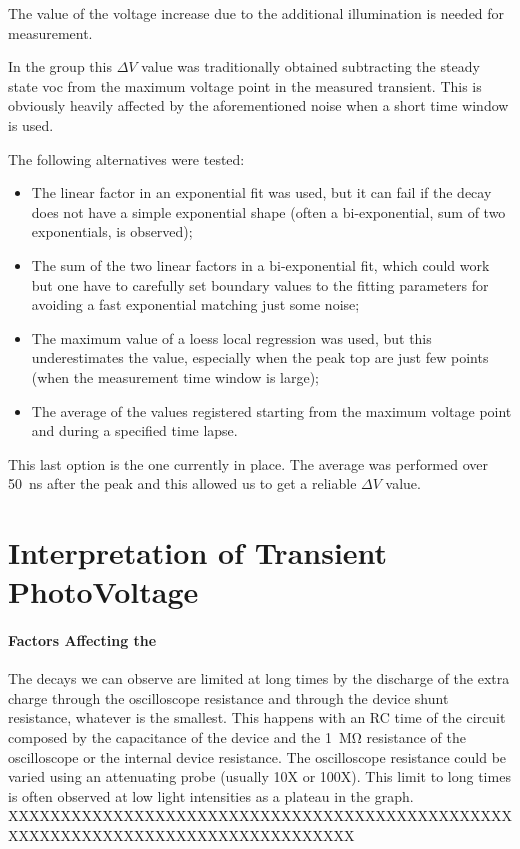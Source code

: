 	The value of the voltage increase due to the additional illumination is needed for  measurement.

	In the group this $\Delta V$ value was traditionally obtained subtracting the steady state \gls{voc} from the maximum voltage point in the measured transient. This is obviously heavily affected by the aforementioned noise when a short time window is used.

	The following alternatives were tested:
	\begin{itemize}
		\item The linear factor in an exponential fit was used, but it can fail if the decay does not have a simple exponential shape (often a bi-exponential, sum of two exponentials, is observed);
		\item The sum of the two linear factors in a bi-exponential fit, which could work but one have to carefully set boundary values to the fitting parameters for avoiding a fast exponential matching just some noise;
		\item The maximum value of a \gls{loess} local regression was used, but this underestimates the value, especially when the peak top are just few points (when the measurement time window is large);
		\item The average of the values registered starting from the maximum voltage point and during a specified time lapse.
	\end{itemize}

	This last option is the one currently in place. The average was performed over \SI{50}{ns} after the peak and this allowed us to get a reliable $\Delta V$ value.

\section{Interpretation of Transient PhotoVoltage}\label{interpretation_tpv}

\paragraph{Factors Affecting the }
The decays we can observe are limited at long times by the discharge of the extra charge through the oscilloscope resistance and through the device shunt resistance, whatever is the smallest. This happens with an RC time of the circuit composed by the capacitance of the device and the \SI{1}{\Mohm} resistance of the oscilloscope or the internal device resistance. The oscilloscope resistance could be varied using an attenuating probe (usually 10X or 100X). This limit to long times is often observed at low light intensities as a plateau in the  graph. XXXXXXXXXXXXXXXXXXXXXXXXXXXXXXXXXXXXXXXXXXXXXXXXXXXXXXXXXXXXXXXXXXXXXXXXXXXXXXXXX


